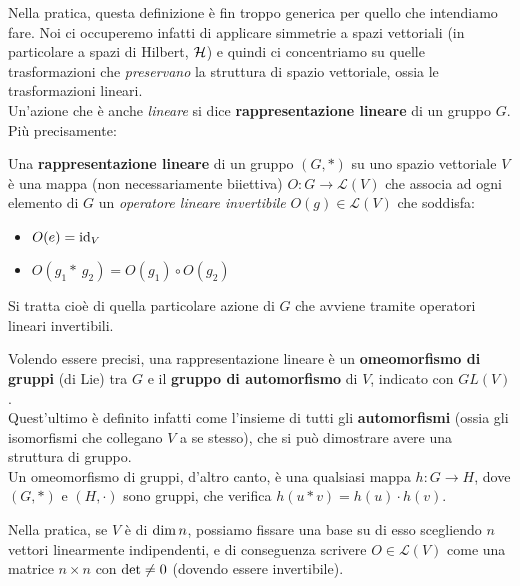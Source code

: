 \documentclass[../../FisicaTeorica.tex]{subfiles}
\begin{document}
Nella pratica, questa definizione è fin troppo generica per quello che intendiamo fare. Noi ci occuperemo infatti di applicare simmetrie a spazi vettoriali (in particolare a spazi di Hilbert, $\mathcal{H}$) e quindi ci concentriamo su quelle trasformazioni che \textit{preservano} la struttura di spazio vettoriale, ossia le trasformazioni lineari.\\
Un'azione che è anche \textit{lineare} si dice \textbf{rappresentazione lineare} di un gruppo $G$. Più precisamente:
\begin{dfn}
Una \textbf{rappresentazione lineare} di un gruppo $(G,*)$ su uno spazio vettoriale $V$ è una mappa (non necessariamente biiettiva) $O:G\to \mathcal{L}(V)$ che associa ad ogni elemento di $G$ un \textit{operatore lineare invertibile} $O(g) \in \mathcal{L}(V)$ che soddisfa:
\begin{itemize}
\item $O(e) = \operatorname{id}_V$
\item $O(g_1 *\ g_2)=O(g_1)\circ O(g_2)$
\end{itemize}
Si tratta cioè di quella particolare azione di $G$ che avviene tramite operatori lineari invertibili.
\end{dfn}

\begin{expl}
Volendo essere precisi, una rappresentazione lineare è un \textbf{omeomorfismo di gruppi} (di Lie) tra $G$ e il \textbf{gruppo di automorfismo} di $V$, indicato con $GL(V)$.\\
Quest'ultimo è definito infatti come l'insieme di tutti gli \textbf{automorfismi} (ossia gli isomorfismi che collegano $V$ a se stesso), che si può dimostrare avere una struttura di gruppo.\\
Un omeomorfismo di gruppi, d'altro canto, è una qualsiasi mappa $h:G\to H$, dove $(G,*)$ e $(H,\cdot)$ sono gruppi, che verifica $h(u*v) = h(u)\cdot h(v)$.
\end{expl}

Nella pratica, se $V$ è di $\operatorname{dim} n$, possiamo fissare una base su di esso scegliendo $n$ vettori linearmente indipendenti, e di conseguenza scrivere $O \in \mathcal{L}(V)$ come una matrice $n\times n$ con $\operatorname{det} \neq 0$ (dovendo essere invertibile).\\
\end{document}
